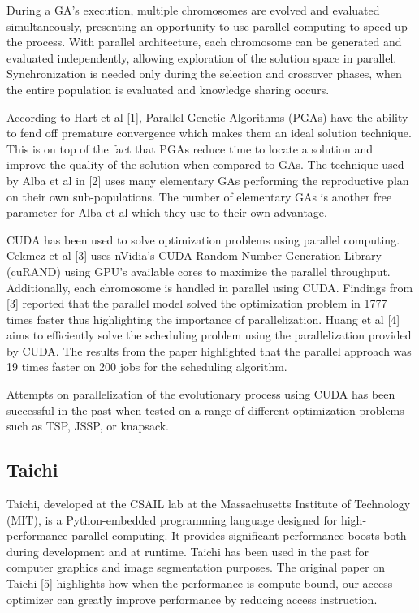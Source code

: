\documentclass[conference]{IEEEtran}
\begin{document}
During a GA's execution, multiple chromosomes are evolved and evaluated
simultaneously, presenting an opportunity to use parallel computing to speed up
the process. With parallel architecture, each chromosome can be generated and
evaluated independently, allowing exploration of the solution space in
parallel. Synchronization is needed only during the selection and crossover
phases, when the entire population is evaluated and knowledge sharing occurs.

According to Hart et al [1], Parallel Genetic Algorithms (PGAs) have the
ability to fend off premature convergence which makes them an ideal solution
technique. This is on top of the fact that PGAs reduce time to locate a
solution and improve the quality of the solution when compared to GAs. The
technique used by Alba et al in [2] uses many elementary GAs performing the
reproductive plan on their own sub-populations. The number of elementary GAs is
another free parameter for Alba et al which they use to their own advantage.

CUDA has been used to solve optimization problems using parallel computing.
Cekmez et al [3] uses nVidia's CUDA Random Number Generation Library (cuRAND)
using GPU's available cores to maximize the parallel throughput. Additionally,
each chromosome is handled in parallel using CUDA. Findings from [3] reported
that the parallel model solved the optimization problem in 1777 times faster
thus highlighting the importance of parallelization. Huang et al [4] aims to
efficiently solve the scheduling problem using the parallelization provided by
CUDA. The results from the paper highlighted that the parallel approach was 19
times faster on 200 jobs for the scheduling algorithm.

Attempts on parallelization of the evolutionary process using CUDA has been
successful in the past when tested on a range of different optimization
problems such as TSP, JSSP, or knapsack.

\subsection{Taichi}
Taichi, developed at the CSAIL lab at the Massachusetts Institute of Technology
(MIT), is a Python-embedded programming language designed for high-performance
parallel computing. It provides significant performance boosts both during
development and at runtime. Taichi has been used in the past for computer
graphics and image segmentation purposes. The original paper on Taichi [5]
highlights how when the performance is compute-bound, our access optimizer can
greatly improve performance by reducing access instruction.
\end{document}
